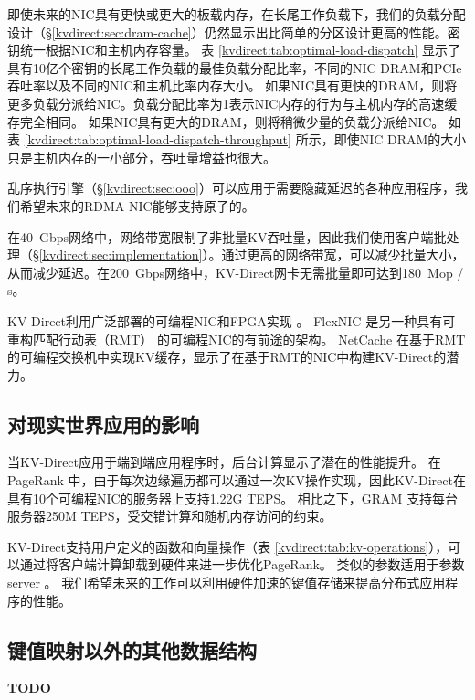 即使未来的NIC具有更快或更大的板载内存，在长尾工作负载下，我们的负载分配设计（\S \ref {kvdirect:sec:dram-cache}）仍然显示出比简单的分区设计更高的性能。密钥统一根据NIC和主机内存容量。
表 \ref {kvdirect:tab:optimal-load-dispatch} 显示了具有10亿个密钥的长尾工作负载的最佳负载分配比率，不同的NIC DRAM和PCIe吞吐率以及不同的NIC和主机比率内存大小。
如果NIC具有更快的DRAM，则将更多负载分派给NIC。负载分配比率为1表示NIC内存的行为与主机内存的高速缓存完全相同。
如果NIC具有更大的DRAM，则将稍微少量的负载分派给NIC。
如表 \ref {kvdirect:tab:optimal-load-dispatch-throughput} 所示，即使NIC DRAM的大小只是主机内存的一小部分，吞吐量增益也很大。

乱序执行引擎（\S \ref {kvdirect:sec:ooo}）可以应用于需要隐藏延迟的各种应用程序，我们希望未来的RDMA NIC能够支持原子的。

在40~Gbps网络中，网络带宽限制了非批量KV吞吐量，因此我们使用客户端批处理（\S \ref {kvdirect:sec:implementation}）。通过更高的网络带宽，可以减少批量大小，从而减少延迟。在200~Gbps网络中，KV-Direct网卡无需批量即可达到180~Mop / s。

KV-Direct利用广泛部署的可编程NIC和FPGA实现 \cite{putnam2014reconfigurable,caulfield2016cloud}。 FlexNIC \cite {kaufmann2015flexnic,kaufmann2016krishnamurthy} 是另一种具有可重构匹配行动表（RMT） \cite {bosshart2013forwarding} 的可编程NIC的有前途的架构。
NetCache \cite {netcache-sosp17} 在基于RMT的可编程交换机中实现KV缓存，显示了在基于RMT的NIC中构建KV-Direct的潜力。

\subsection{对现实世界应用的影响}

当KV-Direct应用于端到端应用程序时，后台计算显示了潜在的性能提升。 在PageRank \cite {page1999pagerank}中，由于每次边缘遍历都可以通过一次KV操作实现，因此KV-Direct在具有10个可编程NIC的服务器上支持1.22G TEPS。 相比之下，GRAM \cite {wu2015g}支持每台服务器250M TEPS，受交错计算和随机内存访问的约束。

KV-Direct支持用户定义的函数和向量操作（表 \ref {kvdirect:tab:kv-operations}），可以通过将客户端计算卸载到硬件来进一步优化PageRank。 类似的参数适用于参数server \cite {li2014scaling}。 我们希望未来的工作可以利用硬件加速的键值存储来提高分布式应用程序的性能。

\subsection{键值映射以外的其他数据结构}

\textbf{TODO}